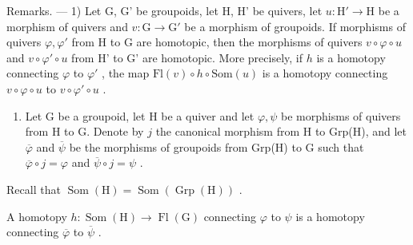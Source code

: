 Remarks. --- 1) Let G, G' be groupoids, let H, H' be quivers, let \(u\colon\mathrm{H}'\to\mathrm{H}\) be a morphism of quivers and \(v\colon\mathrm{G}\to\mathrm{G}'\) be a morphism of groupoids. If morphisms of quivers \(\varphi,\varphi'\) from H to G are homotopic, then the morphisms of quivers \(v\circ\varphi\circ u\) and \(v\circ\varphi'\circ u\) from H' to G' are homotopic. More precisely, if \(h\) is a homotopy connecting \(\varphi\) to \(\varphi'\) , the map \(\mathrm{Fl}(v)\circ h\circ\mathrm{Som}(u)\) is a homotopy connecting \(v\circ\varphi\circ u\) to \(v\circ\varphi'\circ u\) .

\begin{enumerate}
\def\labelenumi{\arabic{enumi})}
\setcounter{enumi}{1}
\tightlist
\item
  Let G be a groupoid, let H be a quiver and let \(\varphi, \psi\) be morphisms of quivers from H to G. Denote by \(j\) the canonical morphism from H to Grp(H), and let \(\overline{\varphi}\) and \(\overline{\psi}\) be the morphisms of groupoids from Grp(H) to G such that \(\overline{\varphi} \circ j = \varphi\) and \(\overline{\psi} \circ j = \psi\) .
\end{enumerate}

Recall that \(\operatorname{Som}(\mathrm{H}) = \operatorname{Som}(\operatorname{Grp}(\mathrm{H}))\) .

A homotopy \(h\colon \operatorname{Som}(\mathrm{H})\to \operatorname{Fl}(\mathrm{G})\) connecting \(\varphi\) to \(\psi\) is a homotopy connecting \(\overline{\varphi}\) to \(\overline{\psi}\) .

